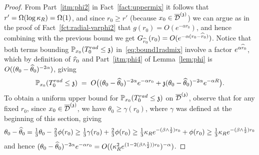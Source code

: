 \begin{proof}
From Part~\eqref{itm:phi2} in Fact~\ref{fact:uppermix} it follows that $r'=\Omega(\log\kappa_R)=\Omega(1)$, and since $r_0\ge r'$ (because $x_0\in\overline{\mathcal{D}}^{(\mathfrak{z})}$) we can argue as in the proof of Fact~\ref{fct:radial-varphi2} that $g(r_0)=O(e^{-\alpha r_0})$, and hence combining with the previous bound we get $G_{\widehat{r}_0}(r_0)=O(e^{-\alpha(r_0-\widehat{r}_0)})$. %
Notice that both terms bounding $\mathbb{P}_{x_0}(T^{rad}_0\leq \mathfrak{z})$ in~\eqref{eq:bound1radmix} involve a factor $e^{\alpha\widehat{r}_0}$, which by definition of $\widehat{r}_0$ and Part~\eqref{itm:phi4} of Lemma~\ref{lem:phi} is $O((\theta_0-\widehat{\theta}_0)^{-2\alpha})$, giving
\begin{equation}\label{eq:mixradialuppermain}\mathbb{P}_{x_0}(T^{rad}_0\leq \mathfrak{z})\;=\;O\big((\theta_0-\widehat{\theta}_0)^{-2\alpha}e^{-\alpha r_0}+\mathfrak{z}(\theta_0-\widehat{\theta}_0)^{-2\alpha}e^{-\alpha R}\big).\end{equation}
To obtain a uniform upper bound for $\mathbb{P}_{x_0}(T^{rad}_0\leq \mathfrak{z})$ on $\overline{\mathcal{D}}^{(\mathfrak{z})}$, observe that for any fixed $r_0$, since $x_0\in\overline{\mathcal{D}}^{(\mathfrak{z})}$, we have $\theta_0\ge\gamma(r_0)$, where $\gamma$ was defined at the beginning of this section, giving
\begin{equation}\label{eq:diffangle}
\theta_0-\widehat{\theta}_0=\tfrac13\theta_0-\tfrac23\phi(r_0)\ge\tfrac13\gamma(r_0)+\tfrac23\phi(r_0)\geq \tfrac13\kappa_R e^{-(\beta\wedge\frac12) r_0}+\phi(r_0)\geq\tfrac13\kappa_R e^{-(\beta\wedge\frac12) r_0}\end{equation}
and hence $(\theta_0-\widehat{\theta}_0)^{-2\alpha}e^{-\alpha r_0}=O((\kappa_R^{2}e^{(1-2(\beta\wedge\frac12))r_0})^{-\alpha})$.

\end{proof}
